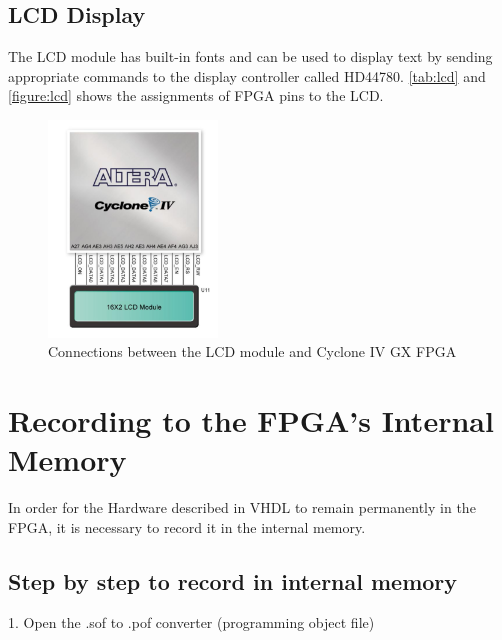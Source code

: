     \section{LCD Display}
        The LCD module has built-in fonts and can be used to display text by sending appropriate
        commands to the display controller called HD44780. \autoref{tab:lcd} and \autoref{figure:lcd} shows the assignments of FPGA pins to the LCD.
        
        \newpage
            
            \begin{figure}[!ht]
                \begin{center}
                    \includegraphics[width= 0.4\textwidth]{figures/chap2/lcd.png}
                    \caption{\label{figure:lcd} Connections between the LCD module and Cyclone IV GX FPGA}
                \end{center}
            \end{figure}
    

\chapter{Recording to the FPGA's Internal Memory} 

    In order for the Hardware described in VHDL to remain permanently in the FPGA, it is necessary to record it in the internal memory.
    
    \section {Step by step to record in internal memory}
    
        1. Open the .sof to .pof converter (programming object file)
        
